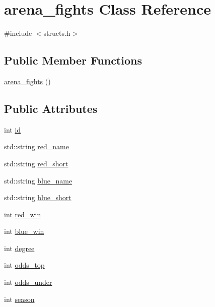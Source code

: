 \hypertarget{classarena__fights}{\section{arena\-\_\-fights Class Reference}
\label{classarena__fights}
}


{\ttfamily \#include $<$structs.\-h$>$}

\subsection*{Public Member Functions}
\begin{DoxyCompactItemize}
\item 
\hyperlink{classarena__fights_aba9c7a9e33d7a4c2b31fe542b3d5a2bc}{arena\-\_\-fights} ()
\end{DoxyCompactItemize}
\subsection*{Public Attributes}
\begin{DoxyCompactItemize}
\item 
int \hyperlink{classarena__fights_a7e1f42a6431003fb2f852eb6fb5e6afe}{id}
\item 
std\-::string \hyperlink{classarena__fights_ad205541a2a692c35f64252d3d2b592a2}{red\-\_\-name}
\item 
std\-::string \hyperlink{classarena__fights_adcca352c69a0254d8c0274481e399ff9}{red\-\_\-short}
\item 
std\-::string \hyperlink{classarena__fights_aecb4273fe2600cafccc859ed4d307af3}{blue\-\_\-name}
\item 
std\-::string \hyperlink{classarena__fights_aa6f4b7b06ccdc44a7b8e4a41603e61f1}{blue\-\_\-short}
\item 
int \hyperlink{classarena__fights_a53884e23f0284d73161487c68ded427f}{red\-\_\-win}
\item 
int \hyperlink{classarena__fights_a7855849929c3cebb5e3c9f43965e9cb4}{blue\-\_\-win}
\item 
int \hyperlink{classarena__fights_aa6db7e4d59b263d32c3fff2b8027a6f8}{degree}
\item 
int \hyperlink{classarena__fights_a6f6ab9a7a094df07da794ea7509a3889}{odds\-\_\-top}
\item 
int \hyperlink{classarena__fights_a38f077818459049c616f6188df12ed9f}{odds\-\_\-under}
\item 
int \hyperlink{classarena__fights_a189a037aeb4a117c55f0fb43cc310279}{season}
\end{DoxyCompactItemize}


